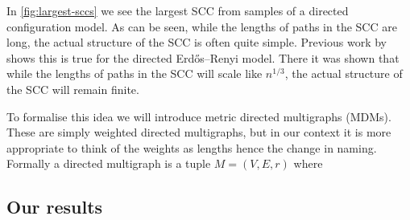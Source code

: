 In \cref{fig:largest-sccs} we see the largest SCC from samples of a directed configuration model. As can be seen, while the lengths of paths in the SCC are long, the actual structure of the SCC is often quite simple. Previous work by \citet{goldschmidtScalingLimitCritical2019} shows this is true for the directed Erdős--Renyi model. There it was shown that while the lengths of paths in the SCC will scale like $n^{1/3}$, the actual structure of the SCC will remain finite.

To formalise this idea we will introduce metric directed multigraphs (MDMs). These are simply weighted directed multigraphs, but in our context it is more appropriate to think of the weights as lengths hence the change in naming. Formally a directed multigraph is a tuple $M = (V, E, r)$ where

\subsection{Our results}

